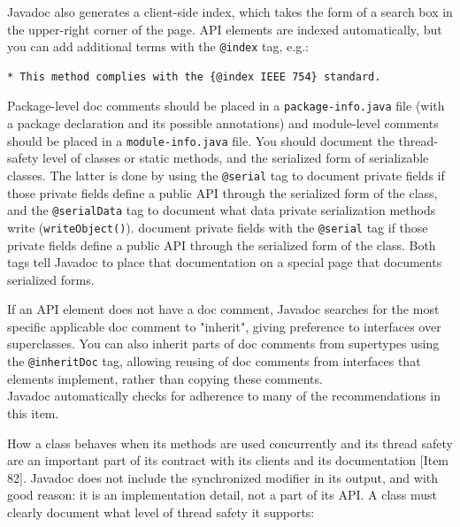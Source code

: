 \documentclass[table, xcdraw]{article}%
\begin{document}
Javadoc also generates a client-side index, which takes the form of a search box in the upper-right corner of the page. API elements are indexed automatically, but you can add additional terms with the \texttt{@index} tag, e.g.:

\begin{verbatim}
* This method complies with the {@index IEEE 754} standard.
\end{verbatim}

Package-level doc comments should be placed in a \texttt{package-info.java} file (with a package declaration and its possible annotations) and module-level comments should be placed in a \texttt{module-info.java} file. You should document the thread-safety level of classes or static methods, and the serialized form of serializable classes. The latter is done by using the \texttt{@serial} tag to document private fields if those private fields define a public API through the serialized form of the class, and the \texttt{@serialData} tag to document what data private serialization methods write (\texttt{writeObject()}). document private fields with the \texttt{@serial} tag if those private fields define a public API through the serialized form of the class. Both tags tell Javadoc to place that documentation on a special page that documents serialized forms.

If an API element does not have a doc comment, Javadoc searches for the most specific applicable doc comment to "inherit", giving preference to interfaces over superclasses. You can also inherit parts of doc comments from supertypes using the \texttt{@inheritDoc}
tag, allowing reusing of doc comments from interfaces that elements implement, rather than copying these comments.\\
Javadoc automatically checks for adherence to many of the recommendations in this item.

How a class behaves when its methods are used concurrently and its thread safety are an important part of its contract with its clients and its documentation [Item 82]. Javadoc does not include the synchronized modifier in its output, and with good reason: it is an implementation detail, not a part of its API. A class must clearly document what level of thread safety it supports:
\end{document}
